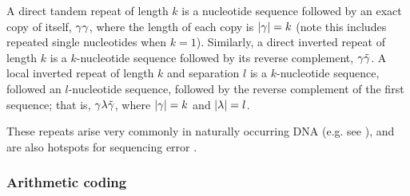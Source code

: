 \documentclass[english]{article}
\begin{document}
A direct tandem repeat of length $k$ is a nucleotide sequence followed by an exact copy of itself, $\gamma \gamma$, where the length of each copy is $|\gamma|=k$
(note this includes repeated single nucleotides when $k=1$).
Similarly, a direct inverted repeat of length $k$ is a $k$-nucleotide sequence followed by its reverse complement, $\gamma \tilde{\gamma}$.
A local inverted repeat of length $k$ and separation $l$ is a $k$-nucleotide sequence, followed an $l$-nucleotide sequence, followed by the reverse complement
of the first sequence; that is, $\gamma \lambda \tilde{\gamma}$, where $|\gamma|=k$ and $|\lambda|=l$.

These repeats arise very commonly in naturally occurring DNA (e.g. see \cite{Ellegren2004}),
and are also hotspots for sequencing error \cite{LaehnemannEtAl2016}.

\subsubsection{Arithmetic coding}
\end{document}
